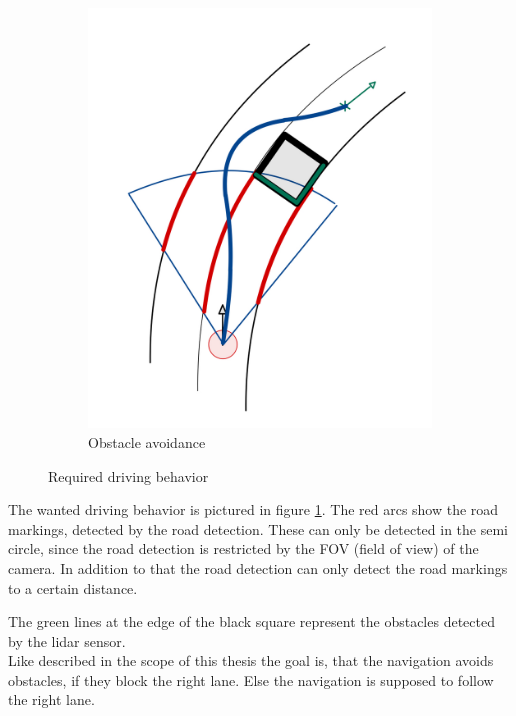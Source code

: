 \begin{figure}
\begin{subfigure}{.3\linewidth}
		\includegraphics[width=\textwidth]{Pictures/obstaclee avoidance draw}
		\caption{Obstacle avoidance}
	\end{subfigure}

	\caption{Required driving behavior}
	\label{driving behavior}

\end{figure}

The wanted driving behavior is pictured in figure \ref{driving behavior}. The red arcs show the road markings, detected by the road detection. These can only be detected in the semi circle, since the road detection is restricted by the FOV (field of view) of the camera. In addition to that the road detection can only detect the road markings to a certain distance.

The green lines at the edge of the black square represent the obstacles detected by the lidar sensor.\\
Like described in the scope of this thesis the goal is, that the navigation avoids obstacles, if they block the right lane. Else the navigation is supposed to follow the right lane.

